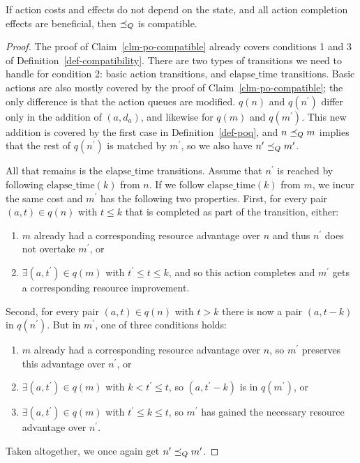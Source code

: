 \documentclass[letterpaper]{article}
\theoremstyle{plain} \newtheorem{theorem}{Theorem} \newtheorem{proposition}{Proposition} \newtheorem{lemma}{Lemma}
\theoremstyle{definition} \newtheorem{definition}{Definition} \newtheorem{conjecture}{Conjecture} \newtheorem*{example}{Example}
\theoremstyle{remark} \newtheorem*{remark}{Remark} \newtheorem*{note}{Note} \newtheorem{case}{Case}
\begin{document}
\begin{claim}{}{\label{clm-poq-compatible}}
	If action costs and effects do not depend on the state, and all action completion effects are beneficial, then $\preceq_Q$ is compatible.
\end{claim}
\begin{proof}

	The proof of Claim~\ref{clm-po-compatible} already covers conditions 1 and 3 of
Definition~\ref{def-compatibility}. There are two types of transitions we need to handle
for condition 2: basic action transitions, and $\mathrm{elapse\_time}$ transitions. Basic
actions are also mostly covered by the proof of Claim~\ref{clm-po-compatible}; the only
difference is that the action queues are modified. $q(n)$ and $q(n^\prime)$ differ only in
the addition of $(a, d_a)$, and likewise for $q(m)$ and $q(m^\prime)$. This new addition is
covered by the first case in Definition~\ref{def-poq}, and $n \preceq_Q m$ implies that the rest
of $q(n^\prime)$ is matched by $m^\prime$, so we also have $n^\prime \preceq_Q m^\prime$.

	All that remains is the $\mathrm{elapse\_time}$ transitions. Assume that $n^\prime$ is
reached by following $\mathrm{elapse\_time}(k)$ from $n$. If we follow $\mathrm{elapse\_time}(k)$ from $m$, we incur the same cost and $m^\prime$ has the following two properties. First, for every pair $(a, t) \in q(n)$ with $t \le k$ that is completed as part of the transition, either:
\begin{enumerate}
	\item $m$ already had a corresponding resource advantage over $n$ and thus $n^\prime$ does not overtake $m^\prime$, or
	\item $\exists (a, t^\prime) \in q(m)$ with $t^\prime \le t \le k$, and so this action completes and $m^\prime$ gets a corresponding resource improvement.
\end{enumerate}
Second, for every pair $(a, t) \in q(n)$ with $t > k$ there is now a pair $(a, t-k)$ in $q(n^\prime)$. But in $m^\prime$, one of three conditions holds:
\begin{enumerate}
	\item $m$ already had a corresponding resource advantage over $n$, so $m^\prime$ preserves this advantage over $n^\prime$, or
	\item $\exists (a, t^\prime) \in q(m)$ with $k < t^\prime \le t$, so $(a, t^\prime-k)$ is in $q(m^\prime)$, or
	\item $\exists (a, t^\prime) \in q(m)$ with $t^\prime \le k \le t$, so $m^\prime$ has gained the necessary resource advantage over $n^\prime$.
\end{enumerate}
Taken altogether, we once again get $n^\prime \preceq_Q m^\prime$.

\end{proof}
\end{document}
